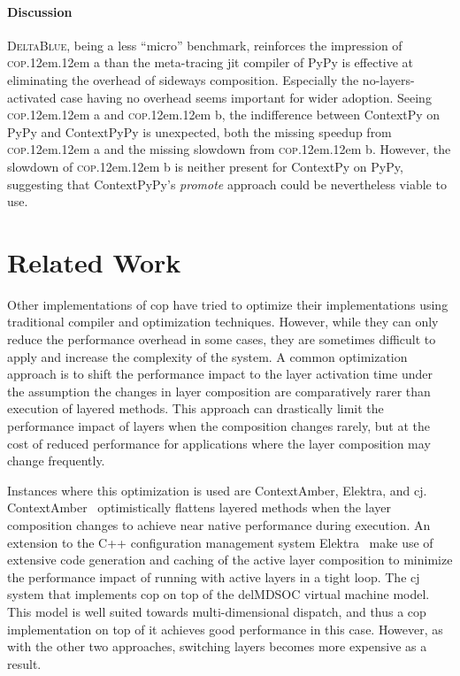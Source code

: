 \documentclass[preprint,english,10pt,nonatbib]{sigplanconf}
\DeclareRobustCommand*\copa{\textsc{cop}\kern .12em\oldstylenums{09}\kern .12em a\xspace}
\DeclareRobustCommand*\copb{\textsc{cop}\kern .12em\oldstylenums{09}\kern .12em b\xspace}
\DeclareRobustCommand*\deltablue{\textsc{DeltaBlue}\xspace}
\begin{document}
\paragraph{Discussion} \deltablue, being a less ``micro'' benchmark, reinforces
the impression of \copa than the meta-tracing \ac{jit} compiler of PyPy is
effective at eliminating the overhead of sideways composition. Especially the
no-layers-activated case having no overhead seems important for wider adoption.
Seeing \copa and \copb, the indifference between ContextPy on PyPy and
ContextPyPy is unexpected, both the missing speedup from \copa and the missing
slowdown from \copb. However, the slowdown of \copb is neither present for
ContextPy on PyPy, suggesting that ContextPyPy's \emph{promote} approach could
be nevertheless viable to use.


\section{Related Work}

Other implementations of \acrlong{cop} have tried to optimize their
implementations using traditional compiler and optimization techniques. However,
while they can only reduce the performance overhead in some cases, they are
sometimes difficult to apply and increase the complexity of the system. A common
optimization approach is to shift the performance impact to the layer activation
time under the assumption the changes in layer composition are comparatively
rarer than execution of layered methods. This approach can drastically limit the
performance impact of layers when the composition changes rarely, but at the
cost of reduced performance for applications where the layer composition may
change frequently.

Instances where this optimization is used are ContextAmber, Elektra, and
cj. ContextAmber~\cite{springer2015efficient} optimistically flattens layered
methods when the layer composition changes to achieve near native performance
during execution. An extension to the C++ configuration management system
Elektra~\cite{Raab:2014:PEE:2637066.2637074} make use of extensive code
generation and caching of the active layer composition to minimize the
performance impact of running with active layers in a tight loop. The
cj\cite{schippers2009implementation,schippers2008delegation} system that
implements \ac{cop} on top of the delMDSOC virtual machine model. This model is
well suited towards multi-dimensional dispatch, and thus a \ac{cop}
implementation on top of it achieves good performance in this case. However, as
with the other two approaches, switching layers becomes more expensive as a
result.
\end{document}
